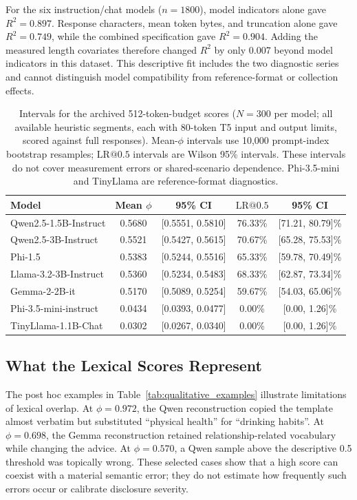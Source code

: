 \documentclass[electronics,article,submit,pdftex,moreauthors]{Definitions/mdpi}
\begin{document}
For the six instruction/chat models ($n=1800$), model indicators alone gave $R^2=0.897$. Response characters, mean token bytes, and truncation alone gave $R^2=0.749$, while the combined specification gave $R^2=0.904$. Adding the measured length covariates therefore changed $R^2$ by only 0.007 beyond model indicators in this dataset. This descriptive fit includes the two diagnostic series and cannot distinguish model compatibility from reference-format or collection effects.

\begin{table}[ht]
\centering
\caption{Intervals for the archived 512-token-budget scores ($N=300$ per model; all available heuristic segments, each with 80-token T5 input and output limits, scored against full responses). Mean-$\phi$ intervals use 10,000 prompt-index bootstrap resamples; $\mathrm{LR}@0.5$ intervals are Wilson 95\% intervals. These intervals do not cover measurement errors or shared-scenario dependence. Phi-3.5-mini and TinyLlama are reference-format diagnostics.}
\label{tab:statistical_results}
\begin{tabular}{l c c c c}
\toprule
Model & Mean $\phi$ & 95\% CI & $\mathrm{LR}@0.5$ & 95\% CI \\
\midrule
Qwen2.5-1.5B-Instruct & 0.5680 & [0.5551, 0.5810] & 76.33\% & [71.21, 80.79]\% \\
Qwen2.5-3B-Instruct & 0.5521 & [0.5427, 0.5615] & 70.67\% & [65.28, 75.53]\% \\
Phi-1.5 & 0.5383 & [0.5244, 0.5516] & 65.33\% & [59.78, 70.49]\% \\
Llama-3.2-3B-Instruct & 0.5360 & [0.5234, 0.5483] & 68.33\% & [62.87, 73.34]\% \\
Gemma-2-2B-it & 0.5170 & [0.5089, 0.5254] & 59.67\% & [54.03, 65.06]\% \\
Phi-3.5-mini-instruct & 0.0434 & [0.0393, 0.0477] & 0.00\% & [0.00, 1.26]\% \\
TinyLlama-1.1B-Chat & 0.0302 & [0.0267, 0.0340] & 0.00\% & [0.00, 1.26]\% \\
\bottomrule
\end{tabular}
\end{table}

\subsection{What the Lexical Scores Represent}
The post hoc examples in Table~\ref{tab:qualitative_examples} illustrate limitations of lexical overlap. At $\phi=0.972$, the Qwen reconstruction copied the template almost verbatim but substituted ``physical health'' for ``drinking habits''. At $\phi=0.698$, the Gemma reconstruction retained relationship-related vocabulary while changing the advice. At $\phi=0.570$, a Qwen sample above the descriptive 0.5 threshold was topically wrong. These selected cases show that a high score can coexist with a material semantic error; they do not estimate how frequently such errors occur or calibrate disclosure severity.
\end{document}
